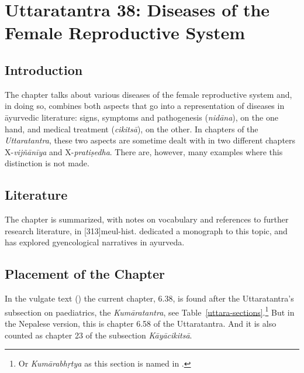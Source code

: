 
\chapter{Uttaratantra 38: Diseases of the Female Reproductive System}

\section{Introduction} 

The chapter talks about various diseases of the female reproductive
system and, in doing so, combines both aspects that go into a
representation of diseases in āyurvedic literature: signs, symptoms and
pathogenesis (\emph{nidāna}), on the one hand, and medical treatment
(\emph{cikitsā}), on the other. In chapters of the \emph{Uttaratantra},
these two aspects are sometime dealt with in two different chapters
X-\emph{vijñānīya} and X-\emph{pratiṣedha}. There are, however, many
examples where this distinction is not made.


\section{Literature}

The chapter is summarized, with notes on vocabulary and references to
further research literature, in [313]{meul-hist}.
\citep{tiva-1990} dedicated a monograph to this topic, and
\citet{selb-2005,selb-2005b} has explored gyencological narratives in
ayurveda.

\section{Placement of the Chapter}

In the vulgate text (\cite{vulgate}) the current chapter, 6.38, is found
after the Uttaratantra's subsection on paediatrics, the
\emph{Kumāratantra}, see Table~\ref{uttara-sections}.\footnote{Or 
\emph{Kumārabhṛtya} as this section is
    named in .}  But in the Nepalese version, this
    is chapter 6.58 of the Uttaratantra. And it is also counted as chapter 23
    of the subsection \emph{Kāyācikitsā}.

